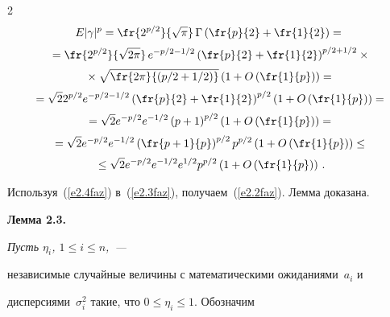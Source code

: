 \begin{multicols}{2}
\begin{multline}
{E}|\gamma|^p=\fr{2^{p/2}}{\sqrt{\pi}}\,\Gamma\left(\fr{p}{2}+\fr{1}{2}\right)={}\\[2pt]


{}=


\fr{2^{p/2}}{\sqrt{2\pi}}\,e^{-p/2-1/2}\left(\fr{p}{2}+\fr{1}{2}\right)^{p/2+1/2}\times{}\\[2pt]


{}\times


\sqrt{\fr{2\pi}{\left(p/2+1/2\right)}}\left(1+O\left(\fr{1}{p}\right)\right)={}\\[2pt]


{}=


\sqrt{2}2^{p/2}e^{-p/2-1/2}\left(\fr{p}{2}+\fr{1}{2}\right)^{p/2}


\left(1+O\left(\fr{1}{p}\right)\right)={}\\[2pt]


{}=\sqrt{2}e^{-p/2}e^{-1/2}\left(p+1\right)^{{p}/{2}}


\left(1+O\left(\fr{1}{p}\right)\right)={}\\[2pt]


{}=


\sqrt{2}e^{-p/2}e^{-1/2}\left(\fr{p+1}{p}\right)^{p/2}p^{p/2}


\left(1+O\left(\fr{1}{p}\right)\right)\le{}\\[2pt]


{}\le


\sqrt{2}e^{-{p}/{2}}e^{-{1}/{2}}e^{{1}/{2}}p^{p/2}


\left(1+O\left(\fr{1}{p}\right)\right)\,.


\label{e2.4faz}


\end{multline}


Используя~(\ref{e2.4faz}) в~(\ref{e2.3faz}), получаем~(\ref{e2.2faz}). Лемма доказана.





\medskip





\noindent





\textbf{Лемма 2.3.} {\it  Пусть $\eta_i$, $1\le i\le n$,~---


независимые случайные величины с математическими ожиданиями~$a_i$ и


дисперсиями~$\sigma_i^2$ такие, что $0\le\eta_i\le 1$. Обозначим


$$


}
\end{multicols}
